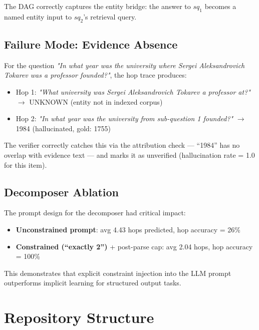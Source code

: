 \documentclass[conference]{IEEEtran}
\begin{document}
The DAG correctly captures the entity bridge: the answer to $sq_1$ becomes a named entity input to $sq_2$'s retrieval query.

\subsection{Failure Mode: Evidence Absence}
For the question \textit{"In what year was the university where Sergei Aleksandrovich Tokarev was a professor founded?"}, the hop trace produces:
\begin{itemize}
    \item Hop 1: \textit{"What university was Sergei Aleksandrovich Tokarev a professor at?"} $\rightarrow$ UNKNOWN (entity not in indexed corpus)
    \item Hop 2: \textit{"In what year was the university from sub-question 1 founded?"} $\rightarrow$ 1984 (hallucinated, gold: 1755)
\end{itemize}

The verifier correctly catches this via the attribution check — ``1984'' has no overlap with evidence text — and marks it as unverified (hallucination rate = 1.0 for this item).

\subsection{Decomposer Ablation}
The prompt design for the decomposer had critical impact:
\begin{itemize}
    \item \textbf{Unconstrained prompt}: avg 4.43 hops predicted, hop accuracy = 26\%
    \item \textbf{Constrained (``exactly 2'')} + post-parse cap: avg 2.04 hops, hop accuracy = 100\%
\end{itemize}

This demonstrates that explicit constraint injection into the LLM prompt outperforms implicit learning for structured output tasks.

\section{Repository Structure}
\end{document}
